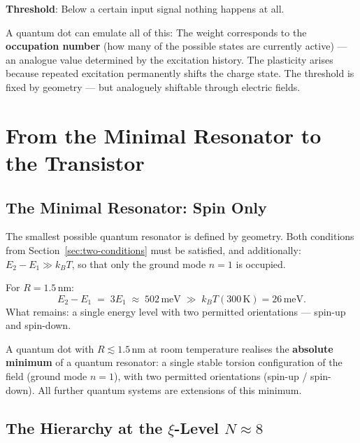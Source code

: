 \textbf{Threshold}: Below a certain input signal
nothing happens at all.

A quantum dot can emulate all of this:
The weight corresponds to the \textbf{occupation number}
(how many of the possible states are currently active) ---
an analogue value determined by the excitation history.
The plasticity arises because repeated excitation
permanently shifts the charge state.
The threshold is fixed by geometry ---
but analoguely shiftable through electric fields.

\section{From the Minimal Resonator to the Transistor}
\label{sec:transistor}

\subsection{The Minimal Resonator: Spin Only}

The smallest possible quantum resonator is defined by geometry.
Both conditions from Section~\ref{sec:two-conditions}
must be satisfied, and additionally:
$E_2 - E_1 \gg k_BT$, so that only the ground mode $n=1$ is occupied.

For $R = 1.5$\,nm:
\begin{equation}
  E_2 - E_1 \;=\; 3 E_1 \;\approx\; 502\,\text{meV}
  \;\gg\; k_BT(300\,\text{K}) = 26\,\text{meV.}
\end{equation}
What remains: a single energy level with two permitted
orientations --- spin-up and spin-down.

\begin{foundation}
A quantum dot with $R \lesssim 1.5$\,nm at room temperature
realises the \textbf{absolute minimum} of a quantum resonator:
a single stable torsion configuration of the field (ground mode $n=1$),
with two permitted orientations (spin-up / spin-down).
All further quantum systems are extensions of this minimum.
\end{foundation}

\subsection{The Hierarchy at the \texorpdfstring{$\xi$}{xi}-Level
  \texorpdfstring{$N \approx 8$}{N~8}}

